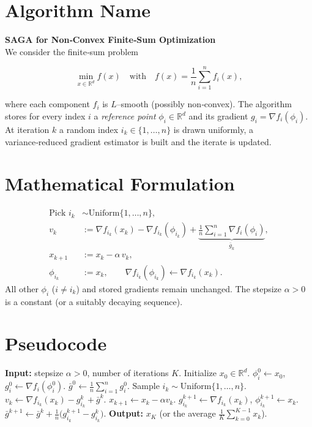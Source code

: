 \documentclass{article}
\newcommand{\R}{\mathbb{R}}
\begin{document}
\section*{Algorithm Name}
\textbf{SAGA for Non‑Convex Finite‑Sum Optimization}\\
We consider the finite‑sum problem  

\[
\min_{x\in\R^{d}} f(x)\quad\text{with}\quad 
f(x)=\frac1n\sum_{i=1}^{n}f_i(x),
\]

where each component $f_i$ is $L$–smooth (possibly non‑convex).  
The algorithm stores for every index $i$ a \emph{reference point}
$\phi_i\in\R^{d}$ and its gradient $g_i=\nabla f_i(\phi_i)$.  
At iteration $k$ a random index $i_k\in\{1,\dots ,n\}$ is drawn
uniformly, a variance‑reduced gradient estimator is built and the iterate
is updated.

\section*{Mathematical Formulation}
\begin{align}
\text{Pick }i_k &\sim \text{Uniform}\{1,\dots ,n\},\\[4pt]
v_k &:= \nabla f_{i_k}(x_k)-\nabla f_{i_k}(\phi_{i_k})+\underbrace{\frac1n\sum_{i=1}^{n}\nabla f_i(\phi_i)}_{\displaystyle \bar g_k},\tag{1}\\[4pt]
x_{k+1} &:= x_k-\alpha\, v_k,\tag{2}\\[4pt]
\phi_{i_k}&:=x_k,\qquad 
\nabla f_{i_k}(\phi_{i_k})\gets \nabla f_{i_k}(x_k).\tag{3}
\end{align}
All other $\phi_i$ ($i\neq i_k$) and stored gradients remain unchanged.
The stepsize $\alpha>0$ is a constant (or a suitably decaying
sequence).  

\section*{Pseudocode}
\begin{algorithm}[H]
\caption{SAGA (non‑convex)}\label{alg:saga}
\begin{algorithmic}[1]
\STATE \textbf{Input:} stepsize $\alpha>0$, number of iterations $K$.
\STATE Initialize $x_0\in\R^{d}$.
    \STATE $\phi_i^{0}\gets x_0$,
    \STATE $g_i^{0}\gets \nabla f_i(\phi_i^{0})$.
\ENDFOR
\STATE $\bar g^{0}\gets \frac1n\sum_{i=1}^{n}g_i^{0}$.
    \STATE Sample $i_k\sim\text{Uniform}\{1,\dots ,n\}$.
    \STATE $v_k\gets \nabla f_{i_k}(x_k)-g_{i_k}^{k}+\bar g^{k}$.
    \STATE $x_{k+1}\gets x_k-\alpha v_k$.
    \STATE $g_{i_k}^{k+1}\gets \nabla f_{i_k}(x_k)$,
          $\phi_{i_k}^{k+1}\gets x_k$.
    \STATE $\bar g^{k+1}\gets \bar g^{k}
          +\frac1n\bigl(g_{i_k}^{k+1}-g_{i_k}^{k}\bigr)$.
\ENDFOR
\STATE \textbf{Output:} $x_K$ (or the average $\frac1K\sum_{k=0}^{K-1}x_k$).
\end{algorithmic}
\end{algorithm}
\end{document}
